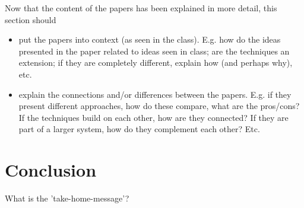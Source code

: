 \documentclass[a4paper,UKenglish]{lipics-v2016}
\begin{document}
  Now that the content of the papers has been explained in more detail,
  this section should
  \begin{itemize}
    \item put the papers into context (as seen in the class). E.g. how do the
    ideas presented in the paper related to ideas seen in class; are the techniques
    an extension; if they are completely different, explain how (and perhaps why), etc.

    \item explain the connections and/or differences between the papers.
      E.g. if they present different approaches, how do these compare, what are the pros/cons?
      If the techniques build on each other, how are they connected?
      If they are part of a larger system, how do they complement each other?
      Etc.

  \end{itemize}

\section{Conclusion}

  What is the 'take-home-message'?





\end{document}
